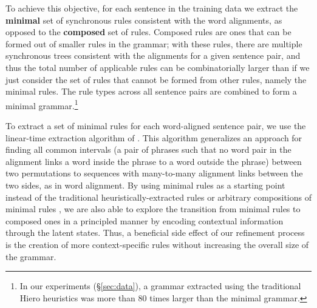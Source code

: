 \documentclass[11pt]{article}
\newcommand{\shaycomment}[1]{\textcolor{blue}{#1 -- Shay}}
\newcommand{\avcomment}[1]{\textcolor{orange}{\textbf{[#1 -- Av]}}}
\begin{document}
To achieve this objective, for each sentence in the training data we extract the {\bf minimal} set of synchronous rules consistent with the word alignments, as opposed to the {\bf composed} set of rules.  
Composed rules are ones that can be formed out of smaller rules in the grammar; with these rules, there are multiple synchronous trees consistent with the alignments for a given sentence pair, and thus the total number of applicable rules can be combinatorially larger than if we just consider the set of rules that cannot be formed from other rules, namely the minimal rules.  
The rule types across all sentence pairs are combined to form a minimal grammar.\footnote{In our experiments (\S\ref{sec:data}), a grammar extracted using the traditional Hiero heuristics was more than 80 times larger than the minimal grammar.} 

To extract a set of minimal rules for each word-aligned sentence pair, we use the linear-time extraction algorithm of .  
This algorithm generalizes an approach for finding all common intervals (a pair of phrases such that no word pair in the alignment links a word inside the phrase to a word outside the phrase) between two permutations to sequences with many-to-many alignment links between the two sides, as in word alignment. 
By using minimal rules as a starting point instead of the traditional heuristically-extracted rules \cite{Chiang2007} or arbitrary compositions of minimal rules \cite{Galley2006}, we are also able to explore the transition from minimal rules to composed ones in a principled manner by encoding contextual information through the latent states.   
Thus, a beneficial side effect of our refinement process is the creation of more context-specific rules without increasing the overall size of the grammar.
\end{document}
